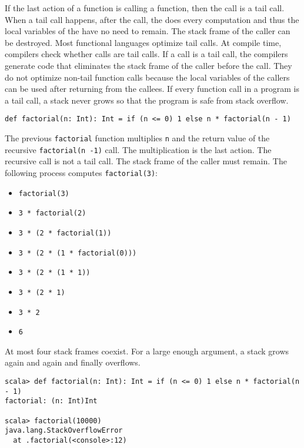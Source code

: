 If the last action of a function is calling a function, then the call is a tail
call. When a tail call happens, after the call, the  does every
computation and thus the local variables of the  have no need to
remain. The stack frame of the caller can be destroyed. Most functional languages
optimize tail calls. At compile time, compilers check whether calls are tail
calls. If a call is a tail call, the compilers generate code that eliminates the
stack frame of the caller before the call. They do not optimize non-tail function
calls because the local variables of the callers can be used after returning from
the callees. If every function call in a program is a tail call, a stack never
grows so that the program is safe from stack overflow.

\begin{verbatim}
def factorial(n: Int): Int = if (n <= 0) 1 else n * factorial(n - 1)
\end{verbatim}

The previous \verb!factorial! function multiplies \verb!n! and the return value
of the recursive \verb!factorial(n -1)! call. The multiplication is the last
action. The recursive call is not a tail call. The stack frame of the caller must
remain. The following process computes \verb!factorial(3)!:

\begin{itemize}
\item \verb!factorial(3)!
\item \verb!3 * factorial(2)!
\item \verb!3 * (2 * factorial(1))!
\item \verb!3 * (2 * (1 * factorial(0)))!
\item \verb!3 * (2 * (1 * 1))!
\item \verb!3 * (2 * 1)!
\item \verb!3 * 2!
\item \verb!6!
\end{itemize}

At most four stack frames coexist. For a large enough argument, a stack grows
again and again and finally overflows.

\begin{verbatim}
scala> def factorial(n: Int): Int = if (n <= 0) 1 else n * factorial(n - 1)
factorial: (n: Int)Int

scala> factorial(10000)
java.lang.StackOverflowError
  at .factorial(<console>:12)
\end{verbatim}


